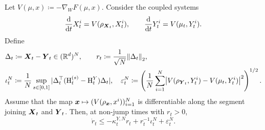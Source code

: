 \begin{lemma}
\label{lemma-bound-r_t-given-eta-eps}
Let $V(\mu,x)\coloneq -\nabla_W F(\mu,x)$.
Consider the coupled systems
\begin{equation}
    \frac{\dd}{\dd t}X_t^i = V(\rho_{\boldsymbol{X}_t},X_t^i),
    \qquad
    \frac{\dd}{\dd t}Y_t^i = V(\mu_t,Y_t^i).
\end{equation}
Define
\begin{align}
    &\Delta_t \coloneq \boldsymbol{X}_t-\boldsymbol{Y}_t \in (\mathbb{R}^{d})^N,
    \qquad
    r_t \coloneq \frac{1}{\sqrt N}\norm{\Delta_t}_2,\\
    &\label{eq:ode-hessian-discrepancy-definition}
    \iota_t^N \coloneq \frac{1}{ N} \sup_{s\in [0,1]} |\Delta_t^\top (\mathrm{H}_t^{(s)} - \mathrm{H}_t^Y) \Delta_t|,\quad 
    \varepsilon_t^N
    \coloneq
    \left(
        \frac{1}{N}\sum_{i=1}^N
        \bigl|V(\rho_{\boldsymbol{Y}_t},Y_t^i)-V(\mu_t,Y_t^i)\bigr|^2
    \right)^{1/2}.
\end{align}
Assume that the map
\(
\boldsymbol{x}\mapsto (V(\rho_{\boldsymbol{x}},x^i))_{i=1}^N
\)
is differentiable along the segment joining $\boldsymbol{X}_t$ and $\boldsymbol{Y}_t$.
Then, at non-jump times with $r_t>0$,
\begin{equation}
    \dot r_t
    \le
    - \kappa_t^{Y,N} r_t
    + r_t^{-1} \iota_t^N 
    + \varepsilon_t^N.
\end{equation}
\end{lemma}

